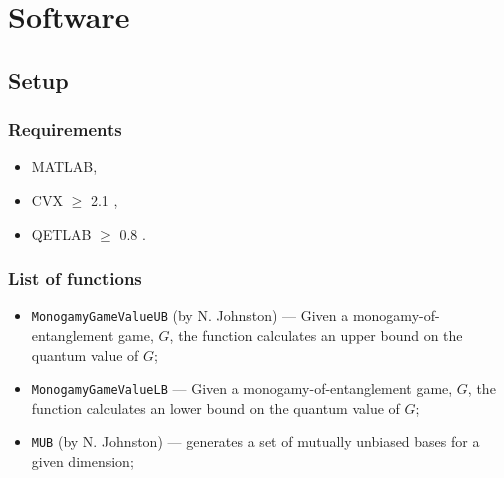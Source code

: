 \chapter{Software}
\label{chap:AppendixA}

\section*{Setup}
\subsection*{Requirements}

\begin{itemize}
    \item MATLAB,
    \item CVX  $\geq$ 2.1 \cite{Grant2008a},
    \item QETLAB $\geq$ 0.8 \cite{Johnston2015}.
\end{itemize}

\subsection*{List of functions}

\begin{itemize}
    
    \item \texttt{MonogamyGameValueUB} (by N. Johnston) ---
        Given a monogamy-of-entanglement game, $G$, the function calculates an upper bound on the quantum value of $G$;
        
    \item \texttt{MonogamyGameValueLB} ---
        Given a monogamy-of-entanglement game, $G$, the function calculates an lower bound on the quantum value of $G$;
        
    \item \texttt{MUB} (by N. Johnston) --- generates a set of mutually unbiased bases for a given dimension;
\end{itemize}


